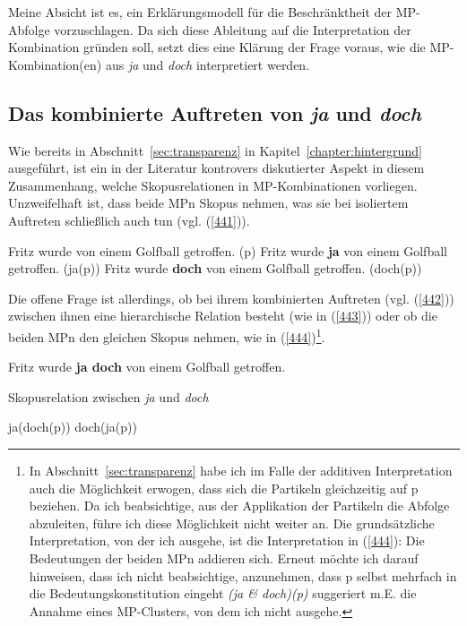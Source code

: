 Meine Absicht ist es, ein Erklärungsmodell für die Beschränktheit der MP-Abfolge vorzuschlagen. Da sich diese Ableitung auf die Interpretation der Kombination gründen soll, setzt dies eine Klärung der Frage voraus, wie die MP-Kombination(en) aus \textit{ja} und \textit{doch} interpretiert werden. 	

\subsection{Das kombinierte Auftreten von \textit{ja} und \textit{doch}}
\label{sec:kombi}
Wie bereits in Abschnitt~\ref{sec:transparenz} in Kapitel~\ref{chapter:hintergrund} ausgeführt, ist ein in der Literatur kontrovers diskutierter Aspekt in diesem Zusammenhang, welche Skopusrelationen  in MP-Kombi\-nationen vorliegen. Unzweifelhaft ist, dass beide MPn Skopus nehmen, was sie bei isoliertem Auftreten schließlich auch tun (vgl. (\ref{441})).

\begin{exe}
	\ex\label{441} 
	\begin{xlist}
		\ex\label{441a} Fritz wurde von einem Golfball getroffen. (p)	
 		\ex\label{441b}	Fritz wurde \textbf{ja} von einem Golfball getroffen. (ja(p))		
		\ex\label{441c}	Fritz wurde \textbf{doch} von einem Golfball getroffen. (doch(p))	
 	\end{xlist}	
\end{exe}
Die offene Frage ist allerdings, ob bei ihrem kombinierten Auftreten (vgl. (\ref{442})) zwischen ihnen eine hierarchische Relation besteht (wie in (\ref{443})) oder ob die beiden MPn den gleichen Skopus nehmen, wie in (\ref{444})\footnote{In Abschnitt~\ref{sec:transparenz} habe ich im Falle der additiven Interpretation auch die Möglichkeit erwogen, dass sich die Partikeln gleichzeitig auf p beziehen. Da ich beabsichtige, aus der Applikation der Partikeln die Abfolge abzuleiten, führe ich diese Möglichkeit nicht weiter an. Die grund\-sätzliche Interpretation, von der ich ausgehe, ist die Interpretation in (\ref{444}): Die Bedeutungen der beiden MPn addieren sich. Erneut möchte ich darauf hinweisen, dass ich nicht beabsichtige, anzunehmen, dass p selbst mehrfach in die Bedeutungskonstitution eingeht \textit{(ja \& doch)(p)} suggeriert m.E. die Annahme eines MP-Clusters, von dem ich nicht ausgehe.}.

\begin{exe}
	\ex\label{442} 
	Fritz wurde \textbf{ja doch} von einem Golfball getroffen.
\end{exe}
\vspace{-0.65cm}	
\begin{exe}
	\ex\label{443} Skopusrelation zwischen \textit{ja} und \textit{doch}\\[-1em]
	\begin{xlist}
		\ex\label{443a} ja(doch(p))	
 		\ex\label{443b}	doch(ja(p))		
 	\end{xlist}	
\end{exe}

